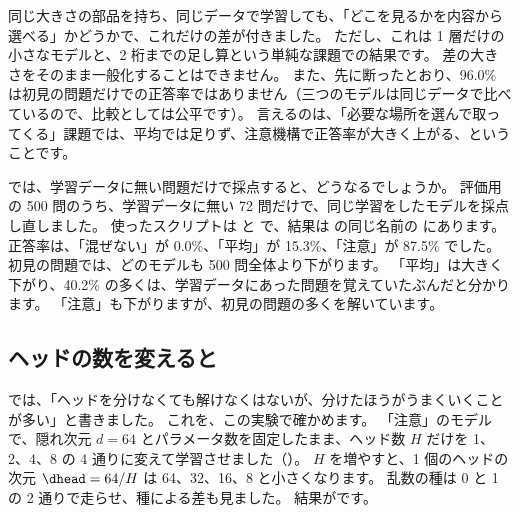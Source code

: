 同じ大きさの部品を持ち、同じデータで学習しても、「どこを見るかを内容から選べる」かどうかで、これだけの差が付きました。
ただし、これは 1 層だけの小さなモデルと、2 桁までの足し算という単純な課題での結果です。
差の大きさをそのまま一般化することはできません。
また、先に断ったとおり、96.0\% は初見の問題だけでの正答率ではありません（三つのモデルは同じデータで比べているので、比較としては公平です）。
言えるのは、「必要な場所を選んで取ってくる」課題では、平均では足りず、注意機構で正答率が大きく上がる、ということです。

では、学習データに無い問題だけで採点すると、どうなるでしょうか。
評価用の 500 問のうち、学習データに無い 72 問だけで、同じ学習をしたモデルを採点し直しました。
使ったスクリプトは  と  で、結果は  の同じ名前の  にあります。
正答率は、「混ぜない」が 0.0\%、「平均」が 15.3\%、「注意」が 87.5\% でした。
初見の問題では、どのモデルも 500 問全体より下がります。
「平均」は大きく下がり、40.2\% の多くは、学習データにあった問題を覚えていたぶんだと分かります。
「注意」も下がりますが、初見の問題の多くを解いています。

\subsection*{ヘッドの数を変えると}

では、「ヘッドを分けなくても解けなくはないが、分けたほうがうまくいくことが多い」と書きました。
これを、この実験で確かめます。
「注意」のモデルで、隠れ次元 $d=64$ とパラメータ数を固定したまま、ヘッド数 $H$ だけを 1、2、4、8 の 4 通りに変えて学習させました（）。
$H$ を増やすと、1 個のヘッドの次元 $\dhead=64/H$ は 64、32、16、8 と小さくなります。
乱数の種は 0 と 1 の 2 通りで走らせ、種による差も見ました。
結果がです。

